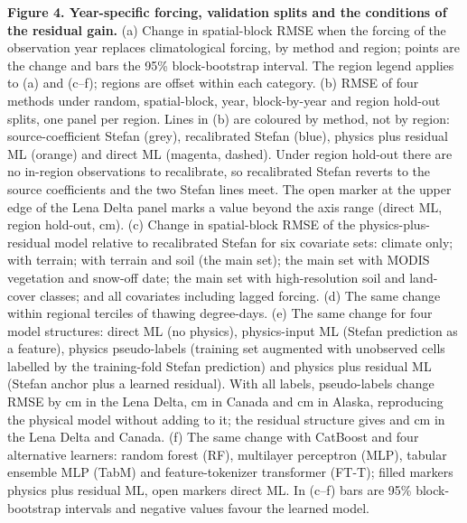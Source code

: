 \ifdefined\vsevenfigs
\textbf{Figure 4. Year-specific forcing, validation splits and the conditions of the residual gain.} (a) Change in spatial-block RMSE when the forcing of the observation year replaces climatological forcing, by method and region; points are the change and bars the 95\% block-bootstrap interval. The region legend applies to (a) and (c--f); regions are offset within each category. (b) RMSE of four methods under random, spatial-block, year, block-by-year and region hold-out splits, one panel per region. Lines in (b) are coloured by method, not by region: source-coefficient Stefan (grey), recalibrated Stefan (blue), physics plus residual ML (orange) and direct ML (magenta, dashed). Under region hold-out there are no in-region observations to recalibrate, so recalibrated Stefan reverts to the source coefficients and the two Stefan lines meet. The open marker at the upper edge of the Lena Delta panel marks a value beyond the axis range (direct ML, region hold-out, \nrmseLeregDz{} cm). (c) Change in spatial-block RMSE of the physics-plus-residual model relative to recalibrated Stefan for six covariate sets: climate only; with terrain; with terrain and soil (the main set); the main set with MODIS vegetation and snow-off date; the main set with high-resolution soil and land-cover classes; and all covariates including lagged forcing. (d) The same change within regional terciles of thawing degree-days. (e) The same change for four model structures: direct ML (no physics), physics-input ML (Stefan prediction as a feature), physics pseudo-labels (training set augmented with unobserved cells labelled by the training-fold Stefan prediction) and physics plus residual ML (Stefan anchor plus a learned residual). With all labels, pseudo-labels change RMSE by \ndrefLeblkDo{} cm in the Lena Delta, \ndrefCablkDo{} cm in Canada and \ndrefAkblkDo{} cm in Alaska, reproducing the physical model without adding to it; the residual structure gives \ndrefLeblkRo{} and \ndrefCablkRo{} cm in the Lena Delta and Canada. (f) The same change with CatBoost and four alternative learners: random forest (RF), multilayer perceptron (MLP), tabular ensemble MLP (TabM) and feature-tokenizer transformer (FT-T); filled markers physics plus residual ML, open markers direct ML. In (c--f) bars are 95\% block-bootstrap intervals and negative values favour the learned model.
\fi

